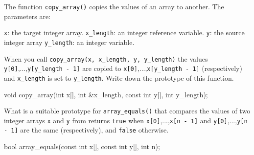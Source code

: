 \nextq
The function \verb!copy_array()! copies the values of an array to another.
The parameters are:
\begin{enumerate}
\li \verb!x!: the target integer array.
\li \verb!x_length!: an integer reference variable.
\li \verb!y!: the source integer array
\li \verb!y_length!: an integer variable.
\end{enumerate}
When you call \texttt{copy\_array(x, x\_length, y, y\_length)} the values
\verb!y[0]!,...,\texttt{y[y\_length - 1]} are copied to
\verb!x[0]!,...,\verb!x[y_length - 1]! (respectively) and
\verb!x_length! is set to \verb!y_length!.
Write down the prototype of this function.
\\
\ANSWER
\begin{answercode}
void copy_array(int x[], int &x_length, const int y[], int y_length);
\end{answercode}

\nextq
What is a suitable prototype for \verb!array_equals()! that
compares the values of two integer arrays \verb!x! and \verb!y!
from returns \verb!true!
when
\verb!x[0]!,...,\verb!x[n - 1]!
and
\verb!y[0]!,...,\verb!y[n - 1]!
are the same (respectively), and \verb!false! otherwise.
\\
\ANSWER
\begin{answercode}
bool array_equals(const int x[], const int y[], int n);
\end{answercode}


